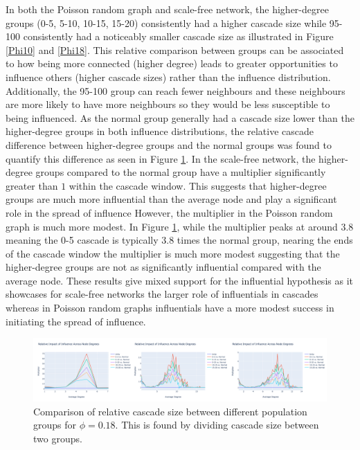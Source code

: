 \documentclass[10pt, oneside, reqno]{amsart}
\theoremstyle{plain}%
\theoremstyle{definition}
\theoremstyle{remark}
\begin{document}
In both the Poisson random graph and scale-free network, the higher-degree groups (0-5, 5-10, 10-15, 15-20) consistently had a higher cascade size while 95-100 consistently had a noticeably smaller cascade size as illustrated in Figure \ref{Phi10} and \ref{Phi18}.
This relative comparison between groups can be associated to how being more connected (higher degree) leads to greater opportunities to influence others (higher cascade sizes) rather than the influence distribution.
Additionally, the 95-100 group can reach fewer neighbours and these neighbours are more likely to have more neighbours so they would be less susceptible to being influenced.
As the normal group generally had a cascade size lower than the higher-degree groups in both influence distributions, the relative cascade difference between higher-degree groups and the normal groups was found to quantify this difference as seen in Figure \ref{Mult18}.
In the scale-free network, the higher-degree groups compared to the normal group have a multiplier significantly greater than $1$ within the cascade window.
This suggests that higher-degree groups are much more influential than the average node and play a significant role in the spread of influence
However, the multiplier in the Poisson random graph is much more modest. In Figure \ref{Mult18}, while the multiplier peaks at around $3.8$ meaning the 0-5 cascade is typically $3.8$ times the normal group, nearing the ends of the cascade window the multiplier is much more modest suggesting that the higher-degree groups are not as significantly influential compared with the average node.
These results give mixed support for the influential hypothesis as it showcases for scale-free networks the larger role of influentials in cascades whereas in Poisson random graphs influentials have a more modest success in initiating the spread of influence.

\begin{figure}[ht]
    \includegraphics[scale=0.2]{Report/figs/Multiplier18.png}
    \caption{Comparison of relative cascade size between different population groups for $\phi = 0.18$. This is found by dividing cascade size between two groups. }
    \label{Mult18}
\end{figure}
\end{document}

